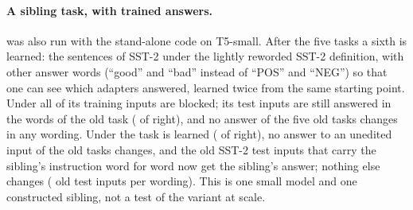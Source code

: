 \begin{table}[t]
  \caption{The stand-alone implementation on three small models (CPU, five tasks, 400 training
  examples and 5 epochs per task, one seed). ``Changed'': answers of the first four tasks that
  differ at the end. ``Certified'': test inputs with the original wording inside a zone.
  ``enc.-dec.'': encoder-decoder; ``dec.-only'': decoder-only.}
  \label{tab:demo}
  \centering
  \footnotesize
  \setlength{\tabcolsep}{3pt}
  
\end{table}

\paragraph{A sibling task, with trained answers.} \exactfirst{} was also run with the
stand-alone code on T5-small. After the five tasks a sixth is learned: the sentences of SST-2
under the lightly reworded SST-2 definition, with other answer words (``good'' and ``bad''
instead of ``POS'' and ``NEG'') so that one can see which adapters answered, learned
twice from the same starting point. Under \cert{} all \SiblingCertBlocked{} of its
\SiblingTrain{} training inputs are blocked; its test inputs are still answered in
the words of the old task (\SiblingCertRight{} of \SiblingTest{} right), and no answer of the five
old tasks changes in any wording. Under \exactfirst{} the task is learned (\SiblingExactRight{} of
\SiblingTest{} right), no answer to an unedited input of the old tasks changes, and the
\SiblingExactChangedLight{} old SST-2 test inputs that carry the sibling's instruction word for
word now get the sibling's answer; nothing else changes (\SiblingOldInputs{} old test inputs per
wording). This is one small model and one constructed sibling, not a test of the variant at scale.
